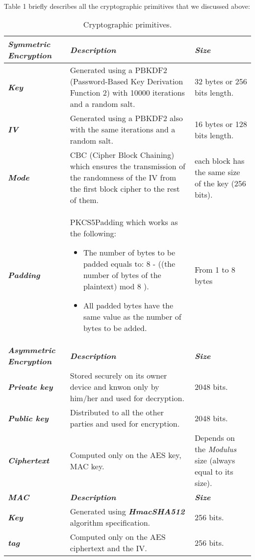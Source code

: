 	\paragraph{}
	Table 1 briefly describes all the cryptographic primitives that we discussed above:
	\newpage
	\begin{table}[H]
	 \centering
	  \begin{tabular}{| p{5cm} | p{5cm} | p{5cm} |}
	  \hline
	    \textbf{\textit{Symmetric Encryption}}  & \textbf{\textit{Description}}  & \textbf{\textit{Size}} \\ \hline
	    \textbf{\textit{Key}}  & Generated using a PBKDF2 (Password-Based Key Derivation Function 2) with 10000 iterations and a random salt. & 32 bytes or 256 bits length. \\ \hline
	    \textbf{\textit{IV}}  & Generated using a PBKDF2 also with the same iterations and a random salt. & 16 bytes or 128 bits length. \\ \hline
	    \textbf{\textit{Mode}}  & CBC (Cipher Block Chaining) which ensures the transmission of the randomness of the IV from the first block cipher to the rest of them. & each block has the same size of the key (256 bits). \\ \hline
	    \textbf{\textit{Padding}} & PKCS5Padding which works as the following:
		      \begin{itemize}
			\item The number of bytes to be padded equals to: 8 - ((the number of bytes of the plaintext) mod 8 ).
			\item All padded bytes have the same value as the number of bytes to be added.
		      \end{itemize} 
		      & From 1 to 8 bytes \\
		      \hline
	    \textbf{\textit{Asymmetric Encryption}} & \textbf{\textit{Description}} & \textbf{\textit{Size}} \\ \hline
	    \textbf{\textit{Private key}} & Stored securely on its owner device and knwon only by him/her and used for decryption. & 2048 bits. \\ \hline
	    \textbf{\textit{Public key}} & Distributed to all the other parties and used for encryption. & 2048 bits. \\ \hline
	    \textbf{\textit{Ciphertext}} & Computed only on the AES key, MAC key. & Depends on the \textit{Modulus} size (always equal to its size). \\ \hline
	    \textbf{\textit{MAC}} & \textbf{\textit{Description}} & \textbf{\textit{Size}} \\ \hline
	    \textbf{\textit{Key}} & Generated using \textbf{\textit{HmacSHA512}} algorithm specification. & 256 bits. \\ \hline
	    \textbf{\textit{tag}} & Computed only on the AES ciphertext and the IV. & 256 bits. \\ \hline

	\end{tabular}
	
	\caption{Cryptographic primitives.}
	\label{Table 1}
	
	\end{table}
	\newpage


	